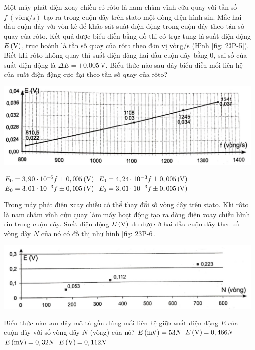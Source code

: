 \begin{ex}
	Một máy phát điện xoay chiều có rôto là nam châm vĩnh cửu quay với tần số $f\ \left(\si{\text{vòng}/\second}\right)$ tạo ra trong cuộn dây trên stato một dòng điện hình sin. Mắc hai đầu cuộn dây với vôn kế để khảo sát suất điện động trong cuộn dây theo tần số quay của rôto. Kết quả được biểu diễn bằng đồ thị có trục tung là suất điện động $\xsi{E}{\left(\volt\right)}$, trục hoành là tần số quay của rôto theo đơn vị vòng/s (Hình \ref{fig: 23P-5}). Biết khi rôto không quay thì suất điện động hai đầu cuộn dây bằng 0, sai số của suất điện động là $\Delta E= \pm \SI{0.005}{\volt}$. Biểu thức nào sau đây biểu diễn mối liên hệ của suất điện động cực đại theo tần số quay của rôto?
	\begin{center}
		\includegraphics[width=0.85\linewidth]{figs/VN12-Y24-PH-SYL-023P-5}
		\label{fig: 23P-5}
	\end{center}
	\choice
	{\True $E_0=\xsi{3,90\cdot10^{-5}f\pm0,005}{\left(\volt\right)}$}
	{$E_0=\xsi{4,24\cdot10^{-3}f\pm0,005}{\left(\volt\right)}$}
	{$E_0=\xsi{3,01\cdot10^{-3}f\pm0,005}{\left(\volt\right)}$}
	{$E_0=\xsi{3,01\cdot10^{-3}f\pm0,005}{\left(\volt\right)}$}
\end{ex}
\begin{ex}
	Trong máy phát điện xoay chiều có thể thay đổi số vòng dây trên stato. Khi rôto là nam châm vĩnh cửu quay làm máy hoạt động tạo ra dòng điện xoay chiều hình sin trong cuộn dây. Suất điện động $\xsi{E}{\left(\volt\right)}$ đo được ở hai đầu cuộn dây theo số vòng dây $N$ của nó có đồ thị như hình \ref{fig: 23P-6}.
	\begin{center}
		\includegraphics[width=0.7\linewidth]{figs/VN12-Y24-PH-SYL-023P-6}
		\label{fig: 23P-6}
	\end{center}
	Biểu thức nào sau đây mô tả gần đúng mối liên hệ giữa suất điện động $E$ của cuộn dây với số vòng dây $N$ (vòng) của nó?
	\choice
	{$\xsi{E}{\left(\milli\volt\right)}=53N$}
	{$\xsi{E}{\left(\volt\right)}=0,466N$}
	{\True $\xsi{E}{\left(\milli\volt\right)}=0,32N$}
	{$\xsi{E}{\left(\volt\right)}=0,112N$}
\end{ex}
